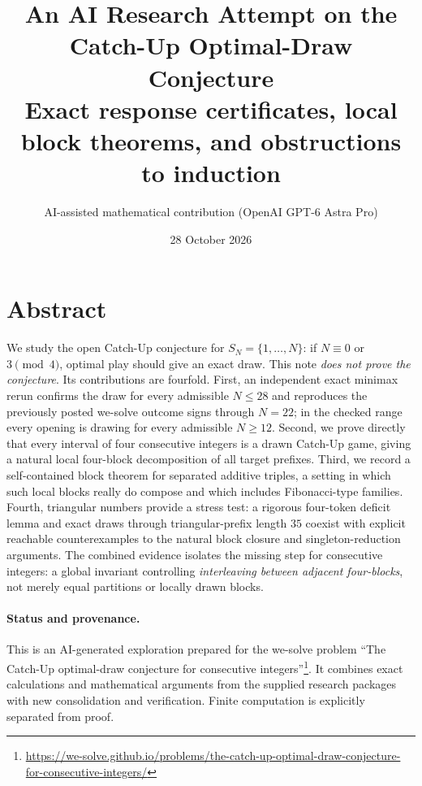 \documentclass[11pt]{article}
\title{An AI Research Attempt on the Catch-Up Optimal-Draw Conjecture\\
\large Exact response certificates, local block theorems, and obstructions to induction}
\author{AI-assisted mathematical contribution (OpenAI GPT-6 Astra Pro)}
\date{28 October 2026}
\theoremstyle{remark}
\begin{document}
\maketitle

\section*{Abstract}
We study the open Catch-Up conjecture for $S_N=\{1,\ldots,N\}$: if
$N\equiv0$ or $3\pmod4$, optimal play should give an exact draw.  This note
\emph{does not prove the conjecture}.  Its contributions are fourfold.
First, an independent exact minimax rerun confirms the draw for every
admissible $N\le28$ and reproduces the previously posted we-solve outcome signs
through $N=22$; in the checked range every opening is drawing for every
admissible $N\ge12$.  Second, we prove directly that every interval of four
consecutive integers is a drawn Catch-Up game, giving a natural local
four-block decomposition of all target prefixes.  Third, we record a
self-contained block theorem for separated additive triples, a setting in
which such local blocks really do compose and which includes Fibonacci-type
families.  Fourth, triangular numbers provide a stress test: a rigorous
four-token deficit lemma and exact draws through triangular-prefix length
$35$ coexist with explicit reachable counterexamples to the natural block
closure and singleton-reduction arguments.  The combined evidence isolates
the missing step for consecutive integers: a global invariant controlling
\emph{interleaving between adjacent four-blocks}, not merely equal partitions
or locally drawn blocks.


\paragraph{Status and provenance.}
This is an AI-generated exploration prepared for the we-solve problem
``The Catch-Up optimal-draw conjecture for consecutive integers''\footnote{%
\url{https://we-solve.github.io/problems/the-catch-up-optimal-draw-conjecture-for-consecutive-integers/}}.
It combines exact calculations and mathematical arguments from the supplied
research packages with new consolidation and verification.  Finite
computation is explicitly separated from proof.
\end{document}

